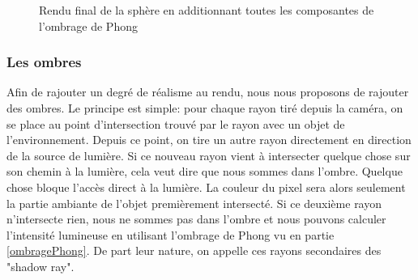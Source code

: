 \documentclass[11pt]{article}
\begin{document}
\begin{figure}[h!]

	\caption{Rendu final de la sphère en additionnant toutes les composantes de l'ombrage de Phong}
	\label{finalPhong}
\end{figure}
\FloatBarrier

\subsubsection{Les ombres}

Afin de rajouter un degré de réalisme au rendu, nous nous proposons de rajouter des ombres. Le principe est simple: pour chaque rayon tiré depuis la caméra, on se place au point d'intersection trouvé par le rayon avec un objet de l'environnement. Depuis ce point, on tire un autre rayon directement en direction de la source de lumière. Si ce nouveau rayon vient à intersecter quelque chose sur son chemin à la lumière, cela veut dire que nous sommes dans l'ombre. Quelque chose bloque l'accès direct à la lumière. La couleur du pixel sera alors seulement la partie ambiante de l'objet premièrement intersecté. Si ce deuxième rayon n'intersecte rien, nous ne sommes pas dans l'ombre et nous pouvons calculer l'intensité lumineuse en utilisant l'ombrage de Phong vu en partie \ref{ombragePhong}. De part leur nature, on appelle ces rayons secondaires des "shadow ray".
\end{document}
